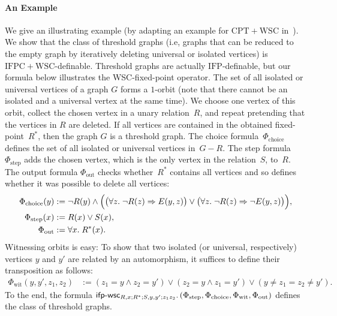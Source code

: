\documentclass[]{lmcs}
\newcommand{\qspace}{\mathchoice{\;}{\,}{}{}}
\newcommand{\formA}{\Phi}
\newcommand{\CPTWSC}{\ensuremath{\mathrm{CPT{+}WSC}}}
\newcommand{\IFP}{\ensuremath{\mathrm{IFP}}}
\newcommand{\IFPCWSC}{\ensuremath{\mathrm{IFPC{+}WSC}}}
\newcommand{\formOut}{\formA_{\text{out}}}
\newcommand{\formStep}{\formA_{\text{step}}}
\newcommand{\formChoice}{\formA_{\text{choice}}}
\newcommand{\formWit}{\formA_{\text{wit}}}
\newcommand{\ifpwscSym}{\mathsf{ifp}\text{-}\mathsf{wsc}}
\newcommand{\ifpwsc}[8]{\ifpwscSym_{#1; #2; #3; #4}.\qspace(#5,#6,#7, #8)}
\begin{document}
\paragraph{An Example}
We give an illustrating example (by adapting an example for \CPTWSC{} in~\cite{LichterSchweitzer24}).
We show that the class of threshold graphs (i.e, graphs that can be reduced to the empty graph by iteratively deleting universal or isolated vertices)
is \IFPCWSC{}-definable.
Threshold graphs are actually \IFP{}-definable, but our formula below illustrates the WSC-fixed-point operator.
The set of all isolated or universal vertices of a graph $G$ forms a $1$-orbit
(note that there cannot be an isolated and a universal vertex at the same time).
We choose one vertex of this orbit, collect the chosen vertex in a unary relation~$R$, and repeat pretending that the vertices in $R$ are deleted.
If all vertices are contained in the obtained fixed-point~$R^*$,
then the graph $G$ is a threshold graph.
The choice formula~$\formChoice$ defines the set of all isolated or universal vertices in~$G - R$.
The step formula~$\formStep$ adds the chosen vertex, which is the only vertex in the relation~$S$, to~$R$.
The output formula $\formOut$ checks whether~$R^*$ contains all vertices
and so defines whether it was possible to delete all vertices:
\begin{align*}
	\formChoice(y) &:= \neg R(y) \land \Big(\big(\forall z.\qspace\neg R(z) \Rightarrow E(y,z)\big) \lor \big(\forall z.\qspace\neg R(z) \Rightarrow \neg  E(y,z)\big)\Big),\\
	\formStep(x) &:= R(x) \lor S(x) , \\
	\formOut &:= \forall x.\qspace R^*(x).
\end{align*}
Witnessing orbits is easy: To show that two isolated (or universal, respectively) vertices $y$ and $y'$ are related by an automorphism, it suffices to define their transposition
as follows:
\begin{align*}
	\formWit(y,y', z_1,z_2) &:= 
		(z_1 = y \land z_2 = y') \lor  
		(z_2 = y \land z_1 = y') \lor 
		(y \neq z_1 = z_2 \neq y').
\end{align*}
To the end, the formula
$\ifpwsc{R,x}{R^*}{S,y, y'}{z_1z_2}{\formStep}{\formChoice}{\formWit}{\formOut}$
defines the class of threshold graphs.
\end{document}
